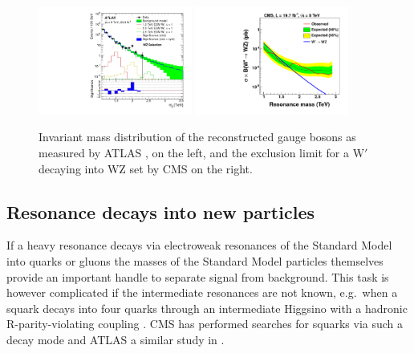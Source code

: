 \begin{figure}
  \includegraphics[width=0.45\textwidth]{figures/ATLAS_Wp_WZ.pdf} 
  \includegraphics[width=0.45\textwidth]{figures/CMS_W_WZ.pdf} 
  \caption{Invariant mass distribution of the reconstructed gauge bosons as measured by ATLAS \cite{Aad:2015owa}, on the left, and the exclusion limit for a $\text{W}'$ decaying into WZ set by CMS \cite{Khachatryan:2014hpa} on the right.}\label{fig:X_VV}
\end{figure}



\subsection{Resonance decays into new particles}

If a heavy resonance decays via electroweak resonances of the Standard Model into quarks or gluons the masses of the Standard Model particles themselves provide an important handle to separate signal from background. This task is however complicated if the intermediate resonances are not known, e.g.\ when a squark decays into four quarks through an intermediate Higgsino with a hadronic R-parity-violating coupling \cite{Butterworth:2009qa}. CMS has performed searches for squarks via such a decay mode \cite{CMS:2018sek} and ATLAS a similar study in \cite{Aad:2016kww}. 

